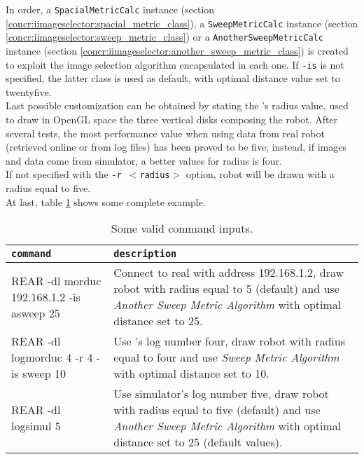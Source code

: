 In order, a \texttt{SpacialMetricCalc} instance
(section \ref{concr:iimageselector:spacial_metric_class}),
a \texttt{SweepMetricCalc} instance
(section \ref{concr:iimageselector:sweep_metric_class}) or
a \texttt{AnotherSweepMetricCalc} instance
(section \ref{concr:iimageselector:another_sweep_metric_class})
is created to exploit the image selection algorithm encapsulated
in each one. If \texttt{-is} is not specified, the latter class
is used as default, with optimal distance value set to twentyfive.
\\
Last possible customization can be obtained by stating the
\morduc{}'s radius value, used to draw in OpenGL space the three
vertical disks composing the robot. After several tests, the
most performance value when using data from real \morduc{} robot
(retrieved online or from log files) has been proved to be five; 
instead, if images and data come from simulator, a better
values for \morduc{} radius is four.
\\
If not specified with the \texttt{-r $<$radius$>$} option, robot
will be drawn with a radius equal to five.
\\
At last, table \ref{table:validopts} shows some complete example.

\begin{table}[!h]
  \centering  
  \begin{tabular}{| l | l |}

    \hline
    \texttt{command} &
    \texttt{description} \\

    \hline
    \small {REAR -dl morduc 192.168.1.2 -is asweep 25} &
    \parbox[t]{6cm}{\raggedright \small
      Connect to real \morduc{} with address 192.168.1.2, draw robot
      with radius equal to 5 (default) and use \textit{Another Sweep
      Metric Algorithm} with optimal distance set to 25.} \\  [1ex]

    \hline
    \small {REAR -dl logmorduc 4 -r 4 -is sweep 10} &
    \parbox[t]{6cm}{\raggedright \small
      Use \morduc{}'s log number four, draw robot
      with radius equal to four and use \textit{Sweep
      Metric Algorithm} with optimal distance set to 10.} \\  [1ex]

    \hline
    \small {REAR -dl logsimul 5} &
    \parbox[t]{6cm}{\raggedright \small
      Use simulator's log number five, draw robot
      with radius equal to five (default) and use \textit{Another Sweep
      Metric Algorithm} with optimal distance set to 25 (default values).} \\  [1ex]

    \hline

  \end{tabular}
  \caption{Some valid command inputs.}
  \label{table:validopts}
\end{table}
